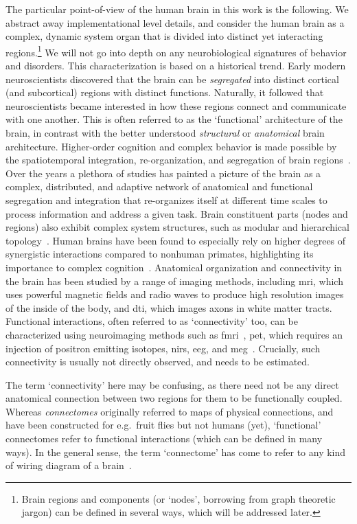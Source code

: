 The particular point-of-view of the human brain in this work is the following.
We abstract away implementational level details, and consider the human brain as a complex, dynamic system organ that is divided into distinct yet interacting regions.\footnote{Brain regions and components (or `nodes', borrowing from graph theoretic jargon) can be defined in several ways, which will be addressed later.}
We will not go into depth on any neurobiological signatures of behavior and disorders.
%
This characterization is based on a historical trend.
Early modern neuroscientists discovered that the brain can be \emph{segregated} into distinct cortical (and subcortical) regions with distinct functions.
Naturally, it followed that neuroscientists became interested in how these regions connect and communicate with one another.
This is often referred to as the `functional' architecture of the brain, in contrast with the better understood \emph{structural} or \emph{anatomical} brain architecture.
Higher-order cognition and complex behavior is made possible by the spatiotemporal integration, re-organization, and segregation of brain regions~\parencite{Deco2011}.
Over the years a plethora of studies has painted a picture of the brain as a complex, distributed, and adaptive network of anatomical and functional segregation and integration that re-organizes itself at different time scales to process information and address a given task.
Brain constituent parts (nodes and regions) also exhibit complex system structures, such as modular and hierarchical topology~\parencite{Meunier2009, Deco2015}.
Human brains have been found to especially rely on higher degrees of synergistic interactions compared to nonhuman primates, highlighting its importance to complex cognition~\parencite{Luppi2022}.
%
Anatomical organization and connectivity in the brain has been studied by a range of imaging methods, including \gls{mri}, which uses powerful magnetic fields and radio waves to produce high resolution images of the inside of the body, and \gls{dti}, which images axons in white matter tracts.
Functional interactions, often referred to as `connectivity' too, can be characterized using neuroimaging methods such as \gls{fmri}~\parencite{Soares2016}, \gls{pet}, which requires an injection of positron emitting isotopes, \gls{nirs}, \gls{eeg}, and \gls{meg}~\parencite{Rossini2019}.
Crucially, such connectivity is usually not directly observed, and needs to be estimated.

The term `connectivity' here may be confusing, as there need not be any direct anatomical connection between two regions for them to be functionally coupled.
Whereas \emph{connectomes} originally referred to maps of physical connections, and have been constructed for e.g.~fruit flies but not humans (yet), `functional' connectomes refer to functional interactions (which can be defined in many ways).
In the general sense, the term `connectome' has come to refer to any kind of wiring diagram of a brain~\parencite{Sporns2005}.

